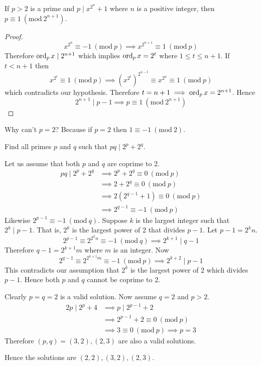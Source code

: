 \documentclass[11pt,numbers=noenddot,svgnames,dvipsnames]{scrartcl}
\renewcommand{\pmod}[1]{\ (\mathrm{mod}\ #1)}
\begin{document}
\begin{lemma}
    If $p > 2$ is a prime and $p \mid x^{2^{n}} + 1$ where $n$ is a positive integer, then 
    $p \equiv 1 \pmod{2^{n + 1}}$.
\end{lemma}
\begin{proof}
    \[
        x^{2^{n}} \equiv -1 \pmod p \implies x^{2^{n + 1}} \equiv 1 \pmod p
    \]
    Therefore $\operatorname{ord}_{p} x \mid 2^{n + 1}$ which implies $\operatorname{ord}_{p} x = 2^{t}$ where 
    $1 \leq t \leq n + 1$. If $t < n + 1$ then 
    \[
        x^{2^{t}} \equiv 1 \pmod p \implies \left(x^{2^{t}}\right)^{2^{n - t}} \equiv x^{2^{n}} \equiv 1 \pmod p
    \]
    which contradicts our hypothesis. Therefore $t = n+1 \implies \operatorname{ord}_{p} x = 2^{n + 1}$. Hence 
    \[
        2^{n+1}\mid p-1 \implies p \equiv 1 \pmod{2^{n+1}}
    \]
\end{proof}

\begin{remark}
    Why can't $p = 2$? Because if $p = 2$ then $ 1 \equiv -1 \pmod 2$.
\end{remark}

\begin{example}
    Find all primes $p$ and $q$ such that $pq \mid 2^{p} + 2^{q}$.
\end{example}
\begin{sol}
    Let us assume that both $p$ and $q$ are coprime to 2.
    \begin{align*}
        pq \mid 2^p + 2^q &\implies 2^p + 2^q \equiv 0 \pmod p \\
                          &\implies 2 + 2^q \equiv 0 \pmod p \\
                          &\implies 2(2^{q-1} + 1) \equiv 0 \pmod p \\
                          &\implies 2^{q-1} \equiv -1 \pmod p 
    \end{align*}
    Likewise $2^{p-1} \equiv -1 \pmod q$. Suppose $k$ is the largest integer 
    such that $2^{k} \mid p-1$. That is, $2^{k}$ is the largest power of 2 that divides $p - 1$. 
    Let $p-1 = 2^{k}n$. 
    \[
        2^{p-1} \equiv 2^{2^{k}n} \equiv -1 \pmod q \implies 2^{k+1} \mid q - 1
    \]
    Therefore $q-1 = 2^{k+1}m$ where $m$ is an integer. Now 
    \[
        2^{q-1} \equiv 2^{2^{k+1}m} \equiv -1 \pmod p \implies 2^{k+2}\mid p - 1
    \]
    This contradicts our assumption that $2^{k}$ is the largest power of $2$ which 
    divides $p-1$. Hence both $p$ and $q$ cannot be coprime to 2. 

    Clearly $p=q=2$ is a valid solution. Now assume $q=2$ and $p>2$. 
    \begin{align*}
        2p \mid 2^{p} + 4 &\implies p \mid 2^{p-1} + 2 \\
                          &\implies 2^{p-1} + 2 \equiv 0 \pmod p \\
                          &\implies 3 \equiv 0 \pmod p \implies p = 3
    \end{align*}
    Therefore $(p,q) = (3, 2), (2, 3)$ are also a valid solutions. 

    Hence the solutions are $(2,2), (3,2), (2,3)$.
\end{sol}
\end{document}
